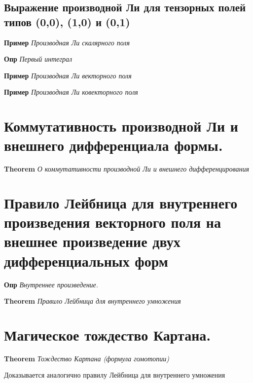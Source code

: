 \documentclass[a4paper, 14pt]{article}
\begin{document}
    \subsection{Выражение производной Ли для тензорных полей типов (0,0), (1,0) и (0,1)}
    
    \textbf{Пример} \textit{Производная Ли скалярного поля}
    
    \textbf{Опр} \textit{Первый интеграл}
    
    \textbf{Пример} \textit{Производная Ли векторного поля}
    
    \textbf{Пример} \textit{Производная Ли ковекторного поля}
    
    \section{Коммутативность производной Ли и внешнего дифференциала формы.}
    
    \textbf{Theorem} \textit{О коммутативности производной Ли и внешнего дифференцирования}
    
    \section{Правило Лейбница для внутреннего произведения векторного поля на внешнее произведение двух
    дифференциальных форм}
    
    \textbf{Опр} \textit{Внутреннее произведение.}
    
    \textbf{Theorem} \textit{Правило Лейбница для внутреннего умножения}
    
    \section{Магическое тождество Картана.}
    
    \textbf{Theorem} \textit{Тождество Картана (формула гомотопии)}
    
    Доказывается аналогично правилу Лейбница для внутреннего умножения
\end{document}
